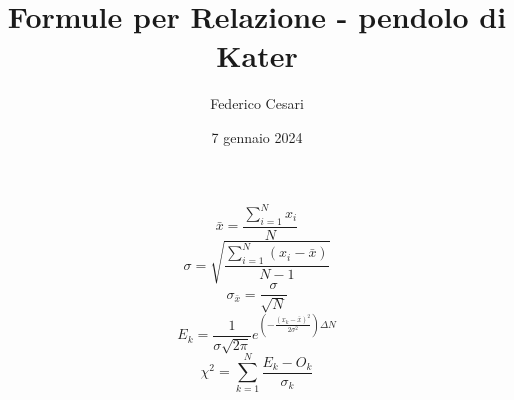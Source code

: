 \documentclass{article}
\title{Formule per Relazione - pendolo di Kater}
\author{Federico Cesari}
\date{7 gennaio 2024}
\begin{document}
\maketitle

\[
\bar{x} = \frac{\sum_{i=1}^{N}x_{i}}{N}
\]
\[
\sigma = \sqrt{\frac{\sum_{i=1}^{N}\left(x_{i} - \bar{x}\right)}{N-1}}
\]
\[
\sigma_{\bar{x}} = \frac{\sigma}{\sqrt{N}}
\]
\[
E_{k} = \frac{1}{\sigma\sqrt{2\pi}}e^{\left(-\frac{\left(x_{k}-\bar{x}\right)^2}{2\sigma^2}\right)\Delta N}
\]
\[
\chi^2 = \sum_{k=1}^{N}\frac{E_{k}-O_{k}}{\sigma_k}
\]
\end{document}
